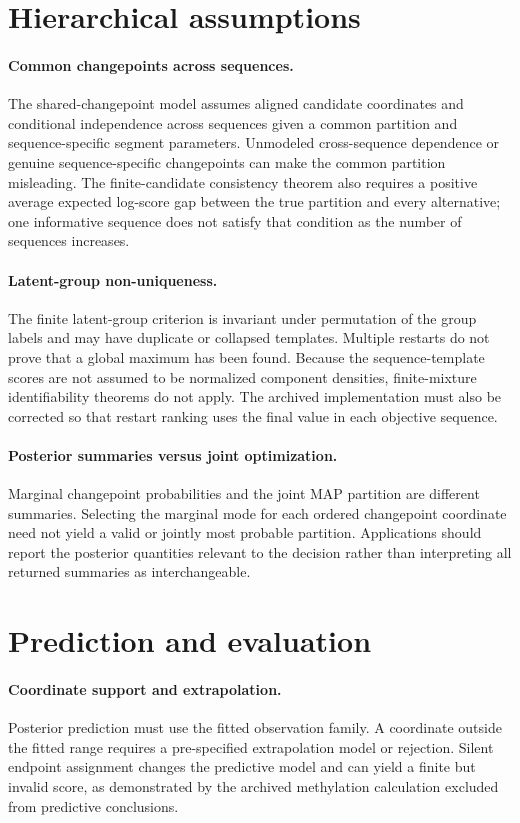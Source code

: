 \section{Hierarchical assumptions}
\paragraph{Common changepoints across sequences.}
The shared-changepoint model assumes aligned candidate coordinates and conditional independence
across sequences given a common partition and sequence-specific segment parameters. Unmodeled
cross-sequence dependence or genuine sequence-specific changepoints can make the common partition
misleading. The finite-candidate consistency theorem also requires a positive average expected
log-score gap between the true partition and every alternative; one informative sequence does not
satisfy that condition as the number of sequences increases.

\paragraph{Latent-group non-uniqueness.}
The finite latent-group criterion is invariant under permutation of the group labels and may have
duplicate or collapsed templates. Multiple restarts do not prove that a global maximum has been
found. Because the sequence-template scores are not assumed to be normalized component densities,
finite-mixture identifiability theorems do not apply. The archived implementation must also be
corrected so that restart ranking uses the final value in each objective sequence.

\paragraph{Posterior summaries versus joint optimization.}
Marginal changepoint probabilities and the joint MAP partition are different summaries. Selecting
the marginal mode for each ordered changepoint coordinate need not yield a valid or jointly most
probable partition. Applications should report the posterior quantities relevant to the decision
rather than interpreting all returned summaries as interchangeable.

\section{Prediction and evaluation}
\paragraph{Coordinate support and extrapolation.}
Posterior prediction must use the fitted observation family. A coordinate outside the fitted range
requires a pre-specified extrapolation model or rejection. Silent endpoint assignment changes the
predictive model and can yield a finite but invalid score, as demonstrated by the archived
methylation calculation excluded from predictive conclusions.

